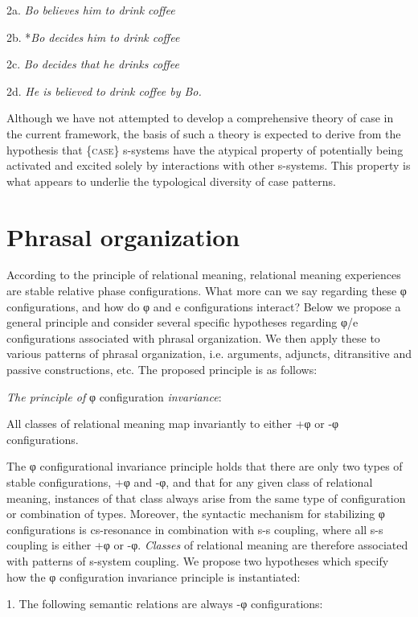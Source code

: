   2a.  \textit{Bo believes him to drink coffee}

  2b.  *\textit{Bo decides him to drink coffee}

  2c.  \textit{Bo decides that he drinks coffee}

  2d.   \textit{He is believed to drink coffee by Bo.}

  Although we have not attempted to develop a comprehensive theory of case in the current framework, the basis of such a theory is expected to derive from the hypothesis that \{\textsc{case}\} s-systems have the atypical property of potentially being activated and excited solely by interactions with other s-systems. This property is what appears to underlie the typological diversity of case patterns. 

\section{Phrasal organization}

According to the principle of relational meaning, relational meaning experiences are stable relative phase configurations. What more can we say regarding these φ configurations, and how do φ and e configurations interact? Below we propose a general principle and consider several specific hypotheses regarding φ/e configurations associated with phrasal organization. We then apply these to various patterns of phrasal organization, i.e. arguments, adjuncts, ditransitive and passive constructions, etc. The proposed principle is as follows:

\textit{The principle of} φ configuration \textit{invariance}: 

  All classes of relational meaning map invariantly to either +φ or -φ configurations. 

  The φ configurational invariance principle holds that there are only two types of stable configurations, +φ and -φ, and that for any given class of relational meaning, instances of that class always arise from the same type of configuration or combination of types. Moreover, the syntactic mechanism for stabilizing φ configurations is cs-resonance in combination with s-s coupling, where all s-s coupling is either +φ or -φ. \textit{Classes} of relational meaning are therefore associated with patterns of s-system coupling. We propose two hypotheses which specify how the φ configuration invariance principle is instantiated:

1. The following semantic relations are always -φ configurations:

